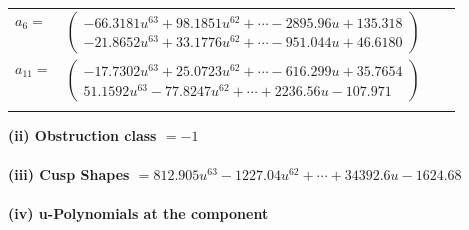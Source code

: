 \documentclass[1p]{elsarticle_modified}
\theoremstyle{definition}
\begin{document}
\begin{tabular}{m{7pt} m{180pt} m{7pt} m{180pt} }
\flushright $a_{6}=$&$\begin{pmatrix}-66.3181 u^{63}+98.1851 u^{62}+\cdots-2895.96 u+135.318\\-21.8652 u^{63}+33.1776 u^{62}+\cdots-951.044 u+46.6180\end{pmatrix}$ \\
\flushright $a_{11}=$&$\begin{pmatrix}-17.7302 u^{63}+25.0723 u^{62}+\cdots-616.299 u+35.7654\\51.1592 u^{63}-77.8247 u^{62}+\cdots+2236.56 u-107.971\end{pmatrix}$\\&\end{tabular}
\flushleft \textbf{(ii) Obstruction class $= -1$}\\~\\
\flushleft \textbf{(iii) Cusp Shapes $= 812.905 u^{63}-1227.04 u^{62}+\cdots+34392.6 u-1624.68$}\\~\\
\newpage\renewcommand{\arraystretch}{1}
\flushleft \textbf{(iv) u-Polynomials at the component}\newline \\
\end{document}
